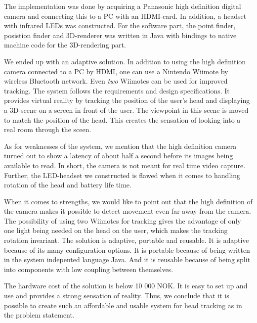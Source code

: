 \documentclass[10pt, twocolumn]{article}
\begin{document}
The implementation was done by acquiring a Panasonic high definition digital camera and connecting this to a PC with an HDMI-card. In addition, a headset with infrared LEDs was constructed. For the software part, the point finder, posistion finder and 3D-renderer was written in Java with bindings to native machine code for the 3D-rendering part.

We ended up with an adaptive solution. In addition to using the high definition camera connected to a PC by HDMI, one can use a Nintendo Wiimote by wireless Bluetooth network. Even {\em two} Wiimotes can be used for improved tracking. The system follows the requirements and design specifications. It provides virtual reality by tracking the position of the user's head and displaying a 3D-scene on a screen in front of the user. The viewpoint in this scene is moved to match the position of the head. This creates the sensation of looking into a real room through the sceen.

As for weaknesses of the system, we mention that the high definition camera turned out to show a latency of about half a second before its images being available to read. In short, the camera is not meant for real time video capture. Further, the LED-headset we constructed is flawed when it comes to handling rotation of the head and battery life time.

When it comes to strengths, we would like to point out that the high definition of the camera makes it possible to detect movement even far away from the camera. The possibility of using two Wiimotes for tracking gives the advantage of only one light being needed on the head on the user, which makes the tracking rotation invariant. The solution is adaptive, portable and reusable. It is adaptive because of its many configuration options. It is portable because of being written in the system indepented language Java. And it is reusable because of being split into components with low coupling between themselves.

The hardware cost of the solution is below 10 000 NOK. It is easy to set up and use and provides a strong sensation of reality. Thus, we conclude that it is possible to create such an affordable and usable system for head tracking as in the problem statement.
\end{document}
